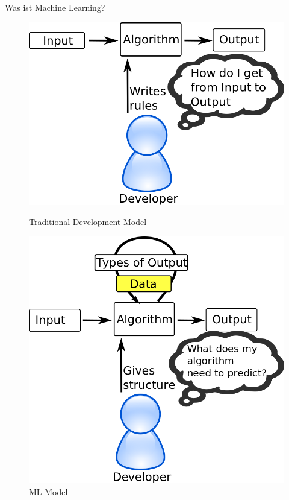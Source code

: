 \documentclass{beamer}
\begin{document}

\title{\titleText}
\author{\tutor}
\date{10. Juli 2015}
\subject{Machine Learning}


\begin{frame}{Was ist Machine Learning?}
    \begin{figure}[ht]
        \begin{minipage}[b]{0.45\linewidth}
            \centering
            \includegraphics[width=\textwidth]{../images/traditional-model.png}
            \caption{Traditional Development Model}
        \end{minipage}
        \hspace{0.5cm}
        \begin{minipage}[b]{0.45\linewidth}
            \centering
            \includegraphics[width=\textwidth]{../images/ml-model.png}
            \caption{ML Model}
        \end{minipage}
    \end{figure}
\end{frame}
\end{document}
